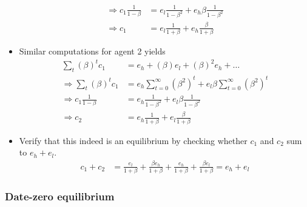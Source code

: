 \documentclass{scrartcl}
\begin{document}
\begin{itemize}
\begin{align}
\Rightarrow	c_{1}\frac{1}{1-\beta}&=e_l\frac{1}{1-\beta^2}+e_h\beta\frac{1}{1-\beta^2} \\
\Rightarrow c_{1}&=e_l\frac{1}{1+\beta}+e_h\frac{\beta}{1+\beta} 
	\end{align}
\item Similar computations for agent 2 yields
	\begin{align}
	\sum_t \left( \beta \right)^t c_{1}&=e_h+\left( \beta \right)e_l+\left( \beta \right)^2e_h+\dots \\
	\Rightarrow 	\sum_t \left( \beta \right)^t c_{1}&=e_h\sum_{t=0}^{\infty} (\beta^2)^t+e_l \beta \sum_{t=0}^{\infty} (\beta^2)^t\\
	\Rightarrow 	c_{1}\frac{1}{1-\beta}&=e_h\frac{1}{1-\beta^2}+e_l\beta\frac{1}{1-\beta^2} \\
	\Rightarrow c_{2}&=e_h\frac{1}{1+\beta}+e_l\frac{\beta}{1+\beta} 
	\end{align}

	
	\item Verify that this indeed is an equilibrium by checking whether $c_1$ and $c_2$ sum to $e_h+e_l$.
	\begin{align}
		c_1+c_2&=\frac{e_l}{1+\beta}+\frac{\beta e_h}{1+\beta}+\frac{e_h}{1+\beta}+\frac{\beta e_l}{1+\beta} = e_h+e_l
	\end{align}
		
\end{itemize}

\subsubsection*{Date-zero equilibrium}
\end{document}
